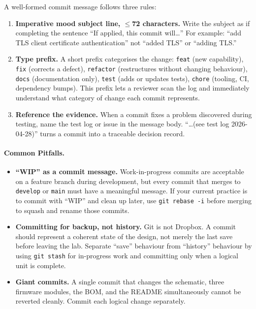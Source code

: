 A well-formed commit message follows three rules:
\begin{enumerate}
  \item \textbf{Imperative mood subject line, $\leq$72 characters.}
        Write the subject as if completing the sentence ``If applied, this commit will\ldots''
        For example: ``add TLS client certificate authentication'' not ``added TLS'' or
        ``adding TLS.''
  \item \textbf{Type prefix.}
        A short prefix categorises the change: \texttt{feat} (new capability),
        \texttt{fix} (corrects a defect), \texttt{refactor} (restructures without
        changing behaviour), \texttt{docs} (documentation only), \texttt{test}
        (adds or updates tests), \texttt{chore} (tooling, CI, dependency bumps).
        This prefix lets a reviewer scan the log and immediately understand what category
        of change each commit represents.
  \item \textbf{Reference the evidence.}
        When a commit fixes a problem discovered during testing, name the test log or
        issue in the message body.
        ``\ldots (see test log 2026-04-28)'' turns a commit into a traceable decision
        record.
\end{enumerate}

\paragraph{Common Pitfalls.}
\begin{itemize}
  \item \textbf{``WIP'' as a commit message.}
        Work-in-progress commits are acceptable on a feature branch during development,
        but every commit that merges to \texttt{develop} or \texttt{main} must have a
        meaningful message.
        If your current practice is to commit with ``WIP'' and clean up later, use
        \texttt{git rebase -i} before merging to squash and rename those commits.
  \item \textbf{Committing for backup, not history.}
        Git is not Dropbox.
        A commit should represent a coherent state of the design, not merely the last
        save before leaving the lab.
        Separate ``save'' behaviour from ``history'' behaviour by using \texttt{git stash}
        for in-progress work and committing only when a logical unit is complete.
  \item \textbf{Giant commits.}
        A single commit that changes the schematic, three firmware modules, the BOM, and
        the README simultaneously cannot be reverted cleanly.
        Commit each logical change separately.
\end{itemize}

